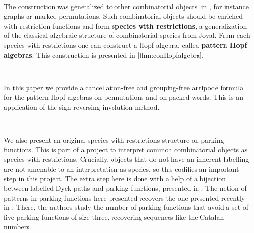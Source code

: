 \documentclass[12pt, reqno]{amsart}
\theoremstyle{definition}
\begin{document}
\

The construction was generalized to other combinatorial objects, in \cite{Penaguiao2020}, for instance graphs or marked permutations.
Such combinatorial objects should be enriched with restriction functions and form \textbf{species with restrictions}, a generalization of the classical algebraic structure of combinatorial species from Joyal. 
From each species with restrictions one can construct a Hopf algebra, called \textbf{pattern Hopf algebras}.
This construction is presented in \cref{thm:conHopfalgebra}.


\

In this paper we provide a cancellation-free and grouping-free antipode formula for the pattern Hopf algebras on permutations and on packed words.
This is an application of the sign-reversing involution method.

\

We also present an original species with restrictions structure on parking functions.
This is part of a project to interpret common combinatorial objects as species with restrictions.
Crucially, objects that do not have an inherent labelling are not amenable to an interpretation as species, so this codifies an important step in this project.
The extra step here is done with a help of a bijection between labelled Dyck paths and parking functions, presented in \cite{Loehr,BGLPV2021}.
The notion of patterns in parking functions here presented recovers the one presented recently in \cite{adeniran2022pattern}.
There, the authors study the number of parking functions that avoid a set of five parking functions of size three, recovering sequences like the Catalan numbers.

\
\end{document}
